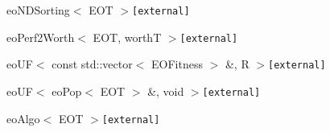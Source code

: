 \begin{CompactList}
\begin{CompactList}
\begin{CompactList}
\begin{CompactList}
\begin{CompactList}
\begin{CompactList}
\item {}
\item {}
\end{CompactList}
\item eo\-NDSorting$<$ EOT $>${\tt  [external]}\begin{CompactList}
\item {}
\end{CompactList}
\end{CompactList}
\end{CompactList}
\item eo\-Perf2Worth$<$ EOT, worth\-T $>${\tt  [external]}\begin{CompactList}
\item {}
\end{CompactList}
\end{CompactList}
\item eo\-UF$<$ const std::vector$<$ EOFitness $>$ \&, R $>${\tt  [external]}\begin{CompactList}
\item {}
\begin{CompactList}
\item {}
\end{CompactList}
\end{CompactList}
\item eo\-UF$<$ eo\-Pop$<$ EOT $>$ \&, void $>${\tt  [external]}\begin{CompactList}
\item eo\-Algo$<$ EOT $>${\tt  [external]}\begin{CompactList}
\item {}
\end{CompactList}
\end{CompactList}
\item {}

\end{CompactList}
\end{CompactList}
